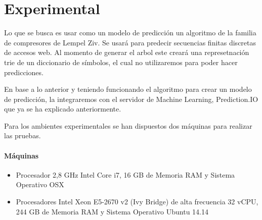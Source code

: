 \chapter[Experimental]{Experimental}






Lo que se busca es usar como un modelo de predicción un algoritmo de la familia de compresores de Lempel Ziv. Se usará para predecir secuencias finitas discretas de accesos web. Al momento de generar el arbol este creará una represetnación trie de un diccionario de símbolos, el cual no utilizaremos para poder hacer predicciones.

En base a lo anterior y teniendo funcionando el algoritmo para crear un modelo de predicción, la integraremos con el servidor de Machine Learning, Prediction.IO que ya se ha explicado anteriormente.




Para los ambientes experimentales se han dispuestos dos máquinas para realizar las pruebas.

\subsubsection{Máquinas}
\begin{itemize}
	\item Procesador 2,8 GHz Intel Core i7, 16 GB de Memoria RAM y Sistema Operativo OSX
	\item Procesadores Intel Xeon E5-2670 v2 (Ivy Bridge) de alta frecuencia 32 vCPU, 244 GB de Memoria RAM y Sistema Operativo Ubuntu 14.14 
\end{itemize}

